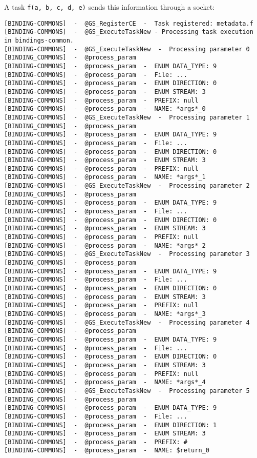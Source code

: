 A task \verb|f(a, b, c, d, e)| sends this information through a socket:
\begin{verbatim}
[BINDING-COMMONS]  -  @GS_RegisterCE  -  Task registered: metadata.f
[BINDING-COMMONS]  -  @GS_ExecuteTaskNew - Processing task execution in bindings-common. 
[BINDING-COMMONS]  -  @GS_ExecuteTaskNew  -  Processing parameter 0
[BINDING_COMMONS]  -  @process_param
[BINDING-COMMONS]  -  @process_param  -  ENUM DATA_TYPE: 9
[BINDING-COMMONS]  -  @process_param  -  File: ...
[BINDING-COMMONS]  -  @process_param  -  ENUM DIRECTION: 0
[BINDING-COMMONS]  -  @process_param  -  ENUM STREAM: 3
[BINDING-COMMONS]  -  @process_param  -  PREFIX: null
[BINDING-COMMONS]  -  @process_param  -  NAME: *args*_0
[BINDING-COMMONS]  -  @GS_ExecuteTaskNew  -  Processing parameter 1
[BINDING_COMMONS]  -  @process_param
[BINDING-COMMONS]  -  @process_param  -  ENUM DATA_TYPE: 9
[BINDING-COMMONS]  -  @process_param  -  File: ...
[BINDING-COMMONS]  -  @process_param  -  ENUM DIRECTION: 0
[BINDING-COMMONS]  -  @process_param  -  ENUM STREAM: 3
[BINDING-COMMONS]  -  @process_param  -  PREFIX: null
[BINDING-COMMONS]  -  @process_param  -  NAME: *args*_1
[BINDING-COMMONS]  -  @GS_ExecuteTaskNew  -  Processing parameter 2
[BINDING_COMMONS]  -  @process_param
[BINDING-COMMONS]  -  @process_param  -  ENUM DATA_TYPE: 9
[BINDING-COMMONS]  -  @process_param  -  File: ...
[BINDING-COMMONS]  -  @process_param  -  ENUM DIRECTION: 0
[BINDING-COMMONS]  -  @process_param  -  ENUM STREAM: 3
[BINDING-COMMONS]  -  @process_param  -  PREFIX: null
[BINDING-COMMONS]  -  @process_param  -  NAME: *args*_2
[BINDING-COMMONS]  -  @GS_ExecuteTaskNew  -  Processing parameter 3
[BINDING_COMMONS]  -  @process_param
[BINDING-COMMONS]  -  @process_param  -  ENUM DATA_TYPE: 9
[BINDING-COMMONS]  -  @process_param  -  File: ...
[BINDING-COMMONS]  -  @process_param  -  ENUM DIRECTION: 0
[BINDING-COMMONS]  -  @process_param  -  ENUM STREAM: 3
[BINDING-COMMONS]  -  @process_param  -  PREFIX: null
[BINDING-COMMONS]  -  @process_param  -  NAME: *args*_3
[BINDING-COMMONS]  -  @GS_ExecuteTaskNew  -  Processing parameter 4
[BINDING_COMMONS]  -  @process_param
[BINDING-COMMONS]  -  @process_param  -  ENUM DATA_TYPE: 9
[BINDING-COMMONS]  -  @process_param  -  File: ...
[BINDING-COMMONS]  -  @process_param  -  ENUM DIRECTION: 0
[BINDING-COMMONS]  -  @process_param  -  ENUM STREAM: 3
[BINDING-COMMONS]  -  @process_param  -  PREFIX: null
[BINDING-COMMONS]  -  @process_param  -  NAME: *args*_4
[BINDING-COMMONS]  -  @GS_ExecuteTaskNew  -  Processing parameter 5
[BINDING_COMMONS]  -  @process_param
[BINDING-COMMONS]  -  @process_param  -  ENUM DATA_TYPE: 9
[BINDING-COMMONS]  -  @process_param  -  File: ...
[BINDING-COMMONS]  -  @process_param  -  ENUM DIRECTION: 1
[BINDING-COMMONS]  -  @process_param  -  ENUM STREAM: 3
[BINDING-COMMONS]  -  @process_param  -  PREFIX: #
[BINDING-COMMONS]  -  @process_param  -  NAME: $return_0
\end{verbatim}

